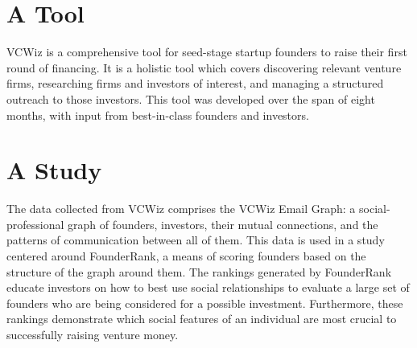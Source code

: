 \section{A Tool}

VCWiz is a comprehensive tool for seed-stage startup founders to raise their first round of financing. It is a holistic tool which covers discovering relevant venture firms, researching firms and investors of interest, and managing a structured outreach to those investors. This tool was developed over the span of eight months, with input from best-in-class founders and investors.

\section{A Study}

The data collected from VCWiz comprises the VCWiz Email Graph: a social-professional graph of founders, investors, their mutual connections, and the patterns of communication between all of them. This data is used in a study centered around FounderRank, a means of scoring founders based on the structure of the graph around them. The rankings generated by FounderRank educate investors on how to best use social relationships to evaluate a large set of founders who are being considered for a possible investment. Furthermore, these rankings demonstrate which social features of an individual are most crucial to successfully raising venture money.
